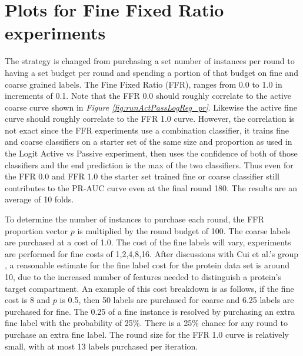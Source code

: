 \documentclass[ms]{nuthesis}
\begin{document}
\section{Plots for Fine Fixed Ratio experiments}
\label{ffrSection}
\par The strategy is changed from purchasing a set number of instances
    per round to having a set budget per round and spending a portion of that budget
    on fine and coarse grained labels. The Fine Fixed Ratio (FFR), ranges from 0.0 to
    1.0 in increments of 0.1. Note that the FFR 0.0 should roughly correlate to the
    active coarse curve shown in \textit{Figure \ref{fig:runActPassLogReg_pr}}. Likewise
    the active fine curve should roughly correlate to the FFR 1.0 curve. However, the correlation
    is not exact since the FFR experiments use a combination classifier, it trains fine and
    coarse classifiers on a starter set of the same size and proportion as used in the
    Logit Active vs Passive experiment, then uses the confidence of both of those classifiers and
    the end prediction is the max of the two classifiers. Thus even for the FFR 0.0 and FFR 1.0
    the starter set trained fine or coarse classifier still contributes to the PR-AUC curve
    even at the final round 180. The results are an average of 10 folds.

    \par To determine the number of instances to purchase each round, the FFR proportion vector $p$
    is multiplied by the
    round budget of 100. The coarse labels are purchased at a cost of 1.0.
    The cost of the fine labels will vary, experiments are performed for fine costs of 1,2,4,8,16. After
     discussions with Cui et al.'s group \cite{bioPoster}, a reasonable estimate for the fine label cost
      for the protein data set is around 10, due to the increased number of features needed to distinguish
      a protein's target compartment. An example of this cost breakdown is as follows,
      if the fine cost is 8 and $p$ is 0.5, then 50 labels are
      purchased for coarse and 6.25 labels are purchased for fine. The 0.25 of a fine instance is
      resolved by purchasing
    an extra fine label with the probability of 25\%. There is a 25\% chance for any round to
    purchase an extra fine label. The round size for the FFR 1.0 curve is relatively small, with
    at most 13 labels purchased per iteration.
\end{document}
